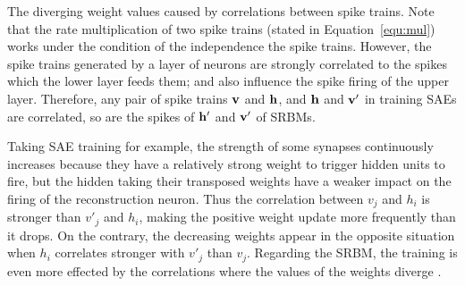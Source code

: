The diverging weight values \DIFdelbegin {}\DIFdelend \DIFaddbegin {}\DIFaddend caused by correlations between spike trains.
Note that the rate multiplication of two spike trains (stated in Equation~\ref{equ:mul}) works under the condition of the independence \DIFdelbegin {}\DIFdelend \DIFaddbegin {}\DIFaddend the spike trains.
However, the spike trains generated by a layer of neurons are strongly correlated to the spikes which the lower layer feeds them; and also influence the spike firing of the upper layer.
Therefore, any pair of spike trains $\bf{v}$ and $\bf{h}$, and $\bf{h}$ and $\bf{v'}$ in training SAEs are correlated, so are the spikes of $\bf{h'}$ and $\bf{v'}$ of SRBMs.


Taking SAE training for example, the strength of some synapses continuously increases because they have a relatively strong weight to trigger hidden units to fire, but the hidden \DIFdelbegin {}\DIFdelend \DIFaddbegin {}\DIFaddend taking their transposed weights have a weaker impact on the firing of the reconstruction neuron.
Thus the correlation between $v_j$ and $h_i$ is stronger than \DIFaddbegin {}\DIFaddend $v'_j$ and $h_i$, making the positive weight update more frequently than it drops.
On the contrary, the decreasing weights appear in the opposite situation when $h_i$ correlates stronger with $v'_j$ than $v_j$.
Regarding the SRBM, the training is even more effected by the correlations where the values of the weights diverge \DIFdelbegin {}\DIFdelend \DIFaddbegin {}\DIFaddend .

